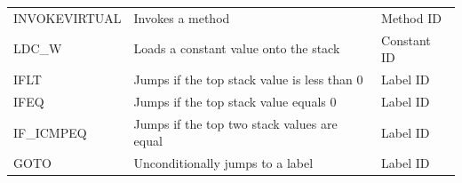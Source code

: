 \documentclass[11pt]{article}
\begin{document}
\begin{table}[H]
{\begin{tabular}{|l|l|l|}
INVOKEVIRTUAL & Invokes a method                                  					& Method ID \\
LDC\_W          	& Loads a constant value onto the stack             			& Constant ID \\
IFLT            		& Jumps if the top stack value is less than 0       			& Label ID \\
IFEQ            		& Jumps if the top stack value equals 0             				& Label ID \\
IF\_ICMPEQ      	& Jumps if the top two stack values are equal       			& Label ID \\
GOTO            		& Unconditionally jumps to a label                 				& Label ID \\
\hline
\end{tabular}
}
\end{table}
\end{document}
